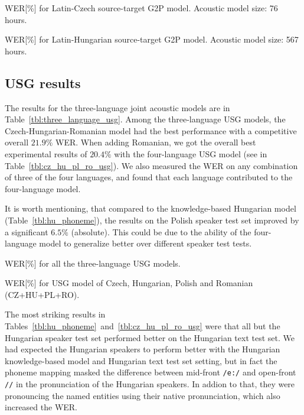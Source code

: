 \documentclass[runningheads,a4paper]{llncs}
\begin{document}
\begin{table}
\parbox{.45\linewidth}{
\centering
\caption{WER[\%] for Latin-Czech source-target G2P model. Acoustic model size: 76 hours.}
\label{tbl:cz_phoneme}
}
\hfill
\parbox{.45\linewidth}{
\centering
\caption{WER[\%] for Latin-Hungarian source-target G2P model. Acoustic model size: 567 hours.}
\label{tbl:hu_phoneme}
}
\end{table}

\subsection{USG results}
The results for the three-language joint acoustic models are in Table~\ref{tbl:three_language_usg}.
Among the three-language USG models, the Czech-Hungarian-Romanian model had the best performance with a competitive overall $21.9\%$ WER. 
When adding Romanian, we got the overall best experimental results of $20.4\%$ with the four-language USG model (see in Table~\ref{tbl:cz_hu_pl_ro_usg}).
We also measured the WER on any combination of three of the four languages, and found that each language contributed to the four-language model.

It is worth mentioning, that compared to the knowledge-based Hungarian model (Table~\ref{tbl:hu_phoneme}), the results on the Polish speaker test set improved by a significant $6.5\%$ (absolute).
This could be due to the ability of the four-language model to generalize better over different speaker test tests.

\begin{table}
\parbox{.45\linewidth}{
\centering
\caption{WER[\%] for all the three-language USG models.}
\label{tbl:three_language_usg}
}
\hfill
\parbox{.45\linewidth}{
\centering
\caption{WER[\%] for USG model of Czech, Hungarian, Polish and Romanian (CZ+HU+PL+RO).}
\label{tbl:cz_hu_pl_ro_usg}
}
\end{table}
The most striking results in Tables~\ref{tbl:hu_phoneme}~and~\ref{tbl:cz_hu_pl_ro_usg} were that all but the Hungarian speaker test set performed better on the Hungarian text test set.
We had expected the Hungarian speakers to perform better with the Hungarian knowledge-based model and Hungarian text test set setting, but in fact the phoneme mapping masked the difference between mid-front \texttt{/e:/} and open-front \texttt{//} in the pronunciation of the Hungarian speakers.
In addion to that, they were pronouncing the named entities using their native pronunciation, which also increased the WER.
\end{document}
